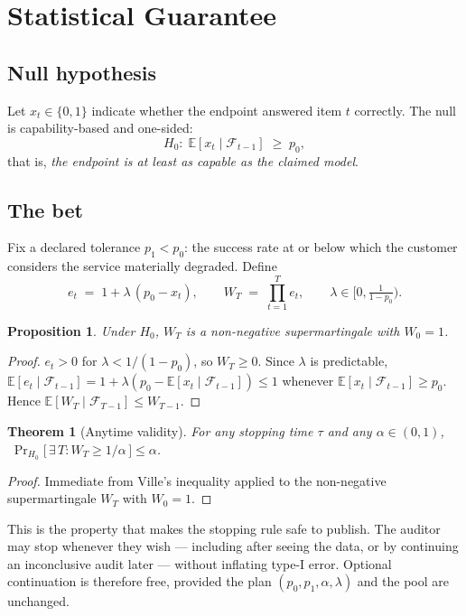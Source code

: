 \documentclass[11pt]{article}
\newtheorem{theorem}{Theorem}
\newtheorem{proposition}{Proposition}
\theoremstyle{definition}
\begin{document}
\section{Statistical Guarantee}
\label{sec:evidence}

\subsection{Null hypothesis}

Let $x_t \in \{0,1\}$ indicate whether the endpoint answered item $t$ correctly.
The null is capability-based and one-sided:
\[
H_0 : \; \mathbb{E}[x_t \mid \mathcal{F}_{t-1}] \;\ge\; p_0 ,
\]
that is, \emph{the endpoint is at least as capable as the claimed model}.

\subsection{The bet}

Fix a declared tolerance $p_1 < p_0$: the success rate at or below which the
customer considers the service materially degraded. Define
\[
e_t \;=\; 1 + \lambda\,(p_0 - x_t), \qquad
W_T \;=\; \prod_{t=1}^{T} e_t , \qquad
\lambda \in \Big[0, \tfrac{1}{1-p_0}\Big).
\]

\begin{proposition}
Under $H_0$, $W_T$ is a non-negative supermartingale with $W_0 = 1$.
\end{proposition}

\begin{proof}
$e_t > 0$ for $\lambda < 1/(1-p_0)$, so $W_T \ge 0$. Since $\lambda$ is
predictable,
$\mathbb{E}[e_t \mid \mathcal{F}_{t-1}] = 1 + \lambda(p_0 - \mathbb{E}[x_t \mid
\mathcal{F}_{t-1}]) \le 1$ whenever $\mathbb{E}[x_t \mid \mathcal{F}_{t-1}] \ge
p_0$. Hence $\mathbb{E}[W_T \mid \mathcal{F}_{T-1}] \le W_{T-1}$.
\end{proof}

\begin{theorem}[Anytime validity]
For any stopping time $\tau$ and any $\alpha \in (0,1)$,
$\;\Pr_{H_0}\big[\,\exists\, T : W_T \ge 1/\alpha \,\big] \le \alpha$.
\end{theorem}

\begin{proof}
Immediate from Ville's inequality applied to the non-negative supermartingale
$W_T$ with $W_0 = 1$.
\end{proof}

\noindent This is the property that makes the stopping rule safe to publish. The
auditor may stop whenever they wish --- including after seeing the data, or by
continuing an inconclusive audit later --- without inflating type-I error.
Optional continuation is therefore free, provided the plan
$(p_0, p_1, \alpha, \lambda)$ and the pool are unchanged.
\end{document}
